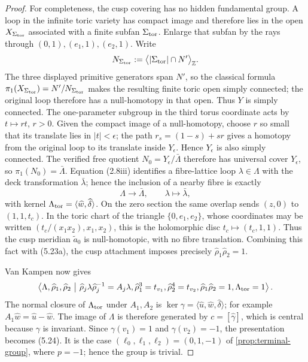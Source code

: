 \begin{proof}
For completeness, the cusp covering has no hidden fundamental group.  A loop
in the infinite toric variety has compact image and therefore lies in the
open \(X_{\Sigma_{\rm tor}}\) associated with a finite subfan
\(\Sigma_{\rm tor}\).  Enlarge that subfan by the rays through
\((0,1),(e_1,1),(e_2,1)\).  Write
\[
 N_{\Sigma_{\rm tor}}
 :=\bigl\langle|\Sigma_{\rm tor}|\cap N'\bigr\rangle_{\mathbb Z}.
\]
The three displayed primitive generators span \(N'\), so the classical
formula
\(\pi_1(X_{\Sigma_{\rm tor}})=N'/N_{\Sigma_{\rm tor}}\)
\cite[Theorem~12.1.10]{CoxLittleSchenck2011} makes the resulting finite toric
open simply connected; the original loop therefore has a null-homotopy in
that open.  Thus \(Y\) is simply connected.  The one-parameter subgroup in
the third torus coordinate acts by \(t\mapsto r t\), \(r>0\).  Given the
compact image of a null-homotopy, choose \(r\) so small that its translate
lies in \(|t|<\epsilon\); the path \(r_s=(1-s)+sr\) gives a homotopy from the
original loop to its translate inside \(Y_\epsilon\).  Hence
\(Y_\epsilon\) is also simply connected.  The verified free quotient
\(N_0=Y_\epsilon/\bar\Lambda\) therefore has universal cover
\(Y_\epsilon\), so
\(\pi_1(N_0)=\bar\Lambda\).  Equation (2.8iii) identifies a fibre-lattice
loop \(\lambda\in\Lambda\) with the deck transformation
\(\bar\lambda\); hence the inclusion of a nearby fibre is exactly
\[
 \Lambda\longrightarrow\bar\Lambda,\qquad
 \lambda\longmapsto\bar\lambda,
\tag{5.23c}
\]
with kernel
\(\Lambda_{\rm tor}=\langle\widehat w,\widehat\delta\rangle\).
On the zero section the same overlap sends \((z,0)\) to
\((1,1,t_c)\).  In the toric chart of the triangle
\(\{0,e_1,e_2\}\), whose coordinates may be written
\((t_c/(x_1x_2),x_1,x_2)\), this is the holomorphic disc
\(t_c\mapsto(t_c,1,1)\).  Thus the cusp meridian
\(\widetilde a_0\) is null-homotopic, with no fibre translation.  Combining
this fact with (5.23a), the cusp attachment imposes precisely
\(\widehat\rho_1\widehat\rho_2=1\).

Van Kampen now gives
\[
\left\langle\Lambda,\widehat\rho_1,\widehat\rho_2\ \middle|\
\widehat\rho_j\lambda\widehat\rho_j^{-1}=A_j\lambda,
\widehat\rho_1^3=t_{v_1},\widehat\rho_2^4=t_{v_2},
\widehat\rho_1\widehat\rho_2=1,
\Lambda_{\rm tor}=1\right\rangle.
\]
The normal closure of \(\Lambda_{\rm tor}\) under \(A_1,A_2\) is
\(\ker\gamma=\langle\widehat u,\widehat w,\widehat\delta\rangle\); for
example \(A_1\widehat w=\widehat u-\widehat w\).  The image of \(\Lambda\)
is therefore generated by \(c=[\widehat\gamma]\), which is central because
\(\gamma\) is invariant.  Since \(\gamma(v_1)=1\) and
\(\gamma(v_2)=-1\), the presentation becomes (5.24).  It is the case
\((\ell_0,\ell_1,\ell_2)=(0,1,-1)\) of
\cref{prop:terminal-group}, where \(p=-1\); hence the group is trivial.
\end{proof}

